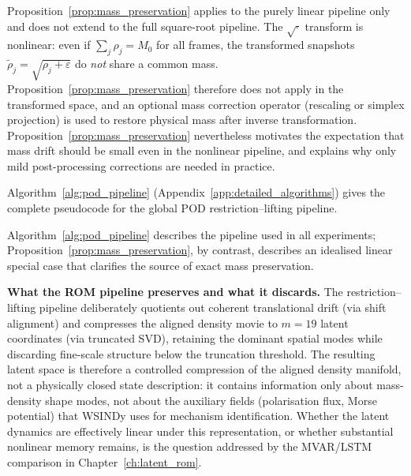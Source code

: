 \begin{remark}
Proposition~\ref{prop:mass_preservation} applies to the purely
linear pipeline only and does not extend to the full square-root pipeline.
The $\sqrt{\cdot}$ transform is nonlinear: even if
$\sum_j\rho_j=M_0$ for all frames, the transformed snapshots
$\tilde\rho_j=\sqrt{\rho_j+\varepsilon}$ do \emph{not} share a common mass.
Proposition~\ref{prop:mass_preservation} therefore does not apply in the
transformed space, and an optional mass correction operator
(rescaling or simplex projection) is used to restore physical
mass after inverse transformation.  Proposition~\ref{prop:mass_preservation}
nevertheless motivates the expectation that mass drift should be small even
in the nonlinear pipeline, and explains why only mild post-processing
corrections are needed in practice.
\end{remark}

Algorithm~\ref{alg:pod_pipeline}
(Appendix~\ref{app:detailed_algorithms}) gives the complete pseudocode
for the global POD restriction--lifting pipeline.

\noindent
Algorithm~\ref{alg:pod_pipeline} describes the pipeline used in
all experiments; Proposition~\ref{prop:mass_preservation}, by contrast,
describes an idealised linear special case that clarifies the source of
exact mass preservation.

\noindent
\textbf{What the ROM pipeline preserves and what it discards.}
The restriction--lifting pipeline deliberately quotients out coherent
translational drift (via shift alignment) and compresses the aligned density
movie to $m=19$ latent coordinates (via truncated SVD), retaining the
dominant spatial modes while discarding fine-scale structure below the
truncation threshold.  The resulting latent space is therefore a controlled
compression of the aligned density manifold, not a physically closed state
description: it contains information only about mass-density shape modes,
not about the auxiliary fields (polarisation flux, Morse potential) that
WSINDy uses for mechanism identification.  Whether the latent dynamics are
effectively linear under this representation, or whether substantial
nonlinear memory remains, is the question addressed by the MVAR/LSTM
comparison in Chapter~\ref{ch:latent_rom}.
